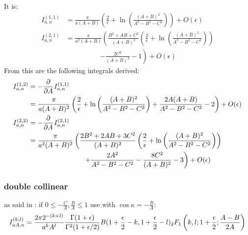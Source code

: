 It is\cite[Ch. 5]{Bojak:2000eu}:
\begin{align}
I_{a,n}^{(1,1)} &= \frac{\pi}{a(A+B)}\left(\frac 2 \epsilon + \ln\left(\frac{(A+B)^2}{A^2-B^2-C^2}\right) \right) + O(\epsilon) \\
I_{a,n}^{(2,1)} &= \frac{\pi}{a^2(A+B)}\left(\frac{B^2+AB+C^2}{(A+B)^2}\left(\frac 2 \epsilon + \ln\left(\frac{(A+B)^2}{A^2-B^2-C^2}\right)\right) \right.\nonumber\\
 &\hspace{60pt}\left. - \frac{2C^2}{(A+B)^2} - 1\right) + O(\epsilon)
\end{align}
From this are the following integrals derived:
\begin{align}
I_{a,n}^{(1,2)} &=-\frac {\partial^{}} {\partial A^{}} {I_{a,n}^{(1,1)}} \\
 &= \frac{\pi}{a(A+B)^2}\left(\frac 2 \epsilon + \ln\left(\frac{(A+B)^2}{A^2-B^2-C^2}\right) + \frac{2A(A+B)}{A^2-B^2-C^2} -2 \right) + O(\epsilon) \\
I_{a,n}^{(2,2)} &=-\frac {\partial^{}} {\partial A^{}} {I_{a,n}^{(2,1)}} \\
 &= \frac{\pi}{a^2(A+B)^2}\left(\frac{2B^2+2AB+3C^2}{(A+B)^2}\left(\frac 2 \epsilon + \ln\left(\frac{(A+B)^2}{A^2-B^2-C^2}\right)\right)\right.\nonumber\\
 &\hspace{80pt}\left. +\frac{2A^2}{A^2-B^2-C^2} - \frac{8C^2}{(A+B)^2} -3 \right) + O(\epsilon)
\end{align}

\subsubsection{double collinear}
as said in \cite[Ch. 5]{Bojak:2000eu}: if $0\leq -\frac{C}{A},\frac B A \leq 1$ use \cite[eq. A11]{van_neerven_dimensional_1986} with $\cos\kappa = -\frac B A$:
\begin{equation}
I_{aA,n}^{(k,l)} = \frac{2\pi 2^{-(k+l)}}{a^kA^l}\frac{\Gamma(1+\epsilon)}{\Gamma^2(1+\epsilon/2)} B(1+\frac \epsilon 2 - k, 1+ \frac \epsilon 2 -l) {}_{2}F_{1} \left(k,l;1+\frac \epsilon 2; \frac{A-B}{2A}\right)
\end{equation}

